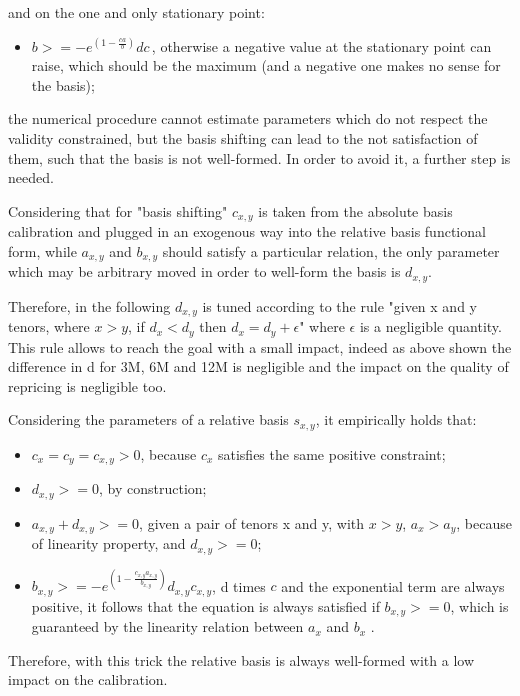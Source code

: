 and on the one and only stationary point:
\begin{itemize}
    \item$b>=-e^{\left(1-\frac{c a}{b}\right)}d c$\,, 
otherwise a negative value at the stationary point can raise, which should be the maximum (and a negative one makes no sense for the basis);
\end{itemize}

the numerical procedure cannot estimate parameters which do not respect the validity constrained, but the basis shifting can lead to the not satisfaction of them, such that the basis is not well-formed.
In order to avoid it, a further step is needed. 

Considering that for "basis shifting" $c_{x,y}$ is taken from the absolute basis calibration and plugged in an exogenous way into the relative basis functional form, while $a_{x,y}$ and $b_{x,y}$ should satisfy a particular relation, the only parameter which may be arbitrary moved in order to well-form the basis is $d_{x,y}$.

Therefore, in the following $d_{x,y}$ is tuned according to the rule "given x and y tenors, where $x>y$, if $d_{x}<d_{y}$ then $d_{x}=d_{y}+\epsilon$" where $\epsilon$ is a negligible quantity. This rule allows to reach the goal with a small impact, indeed as above shown the difference in d for 3M, 6M and 12M is negligible and the impact on the quality of repricing is negligible too.

Considering the parameters of a relative basis $s_{x,y}$, it empirically holds that:

\begin{itemize}
    \item $c_{x}=c_{y}=c_{x,y}>0$, because $c_{x}$ satisfies the same positive constraint;
    \item $d_{x,y}>=0$, by construction;
    \item $a_{x,y}+d_{x,y}>=0$, given a pair of tenors x and y, with $x>y$, $a_{x}>a_{y}$, because of linearity property, and $d_{x,y}>=0$;
    \item $ b_{x,y}>=-e^{\left(1-\frac{c_{x,y} a_{x,y}}{b_{x,y}}\right)}d_{x,y} c_{x,y}$, d times $c$ and the exponential term are always positive, it follows that the equation is always satisfied if $b_{x,y}>=0$, which is guaranteed by the linearity relation between $a_{x}$ and $b_{x}$ .
\end{itemize}

Therefore, with this trick the relative basis is always well-formed with a low impact on the calibration.

